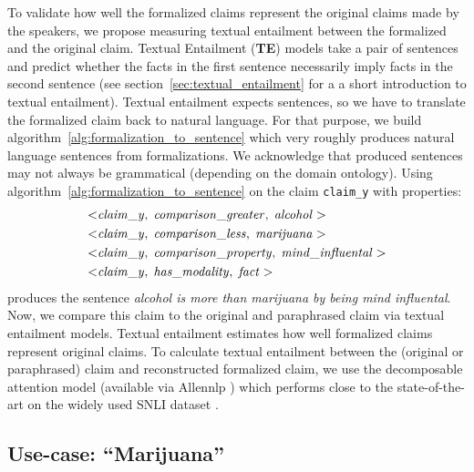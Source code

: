 To validate how well the formalized claims represent the original claims
made by the speakers, we propose measuring textual entailment between the formalized 
and the original claim. Textual Entailment (\textbf{TE}) models take a pair 
of sentences and predict whether the facts in the first sentence necessarily imply
facts in the second sentence (see section~\ref{sec:textual_entailment} for a
a short introduction to textual entailment). Textual entailment expects 
sentences, so we have to translate the formalized claim back to natural language. 
For that purpose, we build algorithm~\ref{alg:formalization_to_sentence} which 
very roughly produces natural language sentences from formalizations. 
We acknowledge that produced sentences may not always be grammatical (depending on the
domain ontology). Using algorithm~\ref{alg:formalization_to_sentence} on the claim 
\texttt{claim\_y} with properties:
\begin{align*}
	< & \mathit{claim\_y}, \hspace{0.1cm} \mathit{comparison\_greater}, \hspace{0.1cm}
	\mathit{alcohol} > \\
	< & \mathit{claim\_y}, \hspace{0.1cm} \mathit{comparison\_less}, \hspace{0.1cm}
	\mathit{marijuana} >  \\
	< & \mathit{claim\_y}, \hspace{0.1cm} \mathit{comparison\_property}, \hspace{0.1cm}
	\mathit{mind\_influental} >  \\
	< & \mathit{claim\_y}, \hspace{0.1cm} \mathit{has\_modality}, \hspace{0.1cm}
	\mathit{fact} > 
\end{align*}
produces the sentence \emph{alcohol is more than marijuana by being mind influental}.
Now, we compare this claim to the original and paraphrased claim via 
textual entailment models. Textual entailment estimates how well 
formalized claims represent original claims. To calculate
textual entailment between the (original or paraphrased) claim and reconstructed
formalized claim, we use the decomposable attention model \citep{parikh2016decomposable}
(available via Allennlp \citep{gardner2018allennlp}) which performs
close to the state-of-the-art on the widely used SNLI dataset \citep{bowman2015large}.

\subsection{Use-case: ``Marijuana'' }
\label{sec:usecase_ontology}

